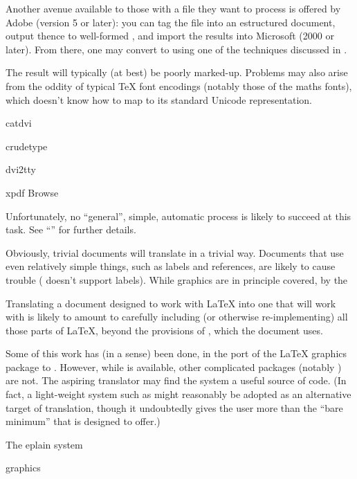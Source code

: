 Another avenue available to those with a  file they want to
process is offered by Adobe  (version 5 or later):
you can tag the  file into an estructured document, output
thence to well-formed , and import the results into
Microsoft  (2000 or later).  From there, one may
convert to \AllTeX{} using one of the techniques discussed in
.

The result will typically (at best) be poorly marked-up.  Problems may
also arise from the oddity of typical \TeX{} font encodings (notably
those of the maths fonts), which  doesn't know how
to map to its standard Unicode representation.
\begin{ctanrefs}
\item[catdvi]
\item[crudetype]
\item[dvi2tty]
\item[xpdf]Browse 
\end{ctanrefs}


Unfortunately, no ``general'', simple, automatic process is likely to
succeed at this task.  See %
``''
for further details.

Obviously, trivial documents will translate in a trivial way.
Documents that use even relatively simple things, such as labels and
references, are likely to cause trouble (\plaintex{} doesn't support
labels).  While graphics are in principle covered, by the \plaintex{}

Translating a document designed to work with \LaTeX{} into one
that will work with \plaintex{} is likely to amount to carefully
including (or otherwise re-implementing) all those parts of \LaTeX{},
beyond the provisions of \plaintex{}, which the document uses.

Some of this work has (in a sense) been done, in the port of the
\LaTeX{} graphics package to \plaintex{}.  However, while
 is available, other complicated packages (notably
) are not.  The aspiring translator may find the
 system a useful source of code.  (In fact,
a light-weight system such as \Eplain{} might reasonably be adopted as
an alternative target of translation, though it undoubtedly gives the
user more than the ``bare minimum'' that \plaintex{} is designed to
offer.)
\begin{ctanrefs}
\item[\nothtml{\begingroup\rmfamily}The\nothtml{\endgroup} eplain \nothtml{\rmfamily}system]%
\item[\nothtml{\begingroup\rmfamily'}\plaintex{}\nothtml{'\endgroup} graphics]%
\end{ctanrefs}
